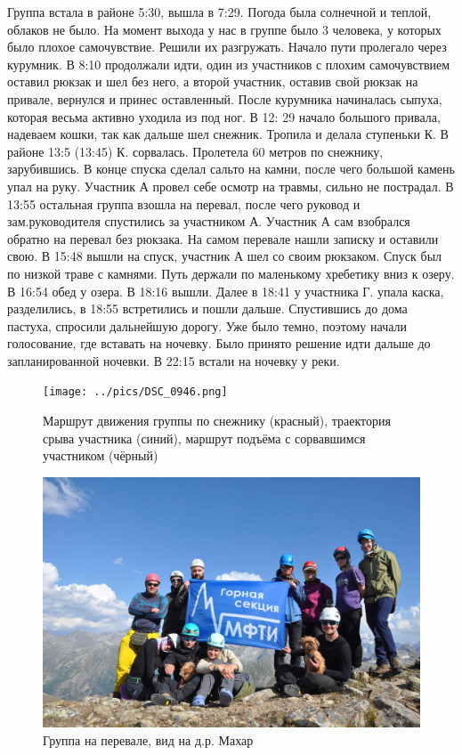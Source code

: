 Группа встала в районе 5:30, вышла в 7:29. Погода была солнечной и теплой, облаков не было. На момент выхода у нас в группе было 3 человека, у которых было плохое самочувствие. Решили их разгружать. Начало пути пролегало через курумник.  В 8:10 продолжали идти, один из участников с плохим самочувствием оставил рюкзак и шел без него, а второй участник, оставив свой рюкзак на привале, вернулся и принес оставленный.  После курумника начиналась сыпуха, которая весьма активно уходила из под ног. В 12: 29 начало большого привала, надеваем кошки, так как дальше шел снежник. Тропила и делала ступеньки К. В районе 13:5 (13:45) К. сорвалась. Пролетела 60 метров по снежнику, зарубившись. В конце спуска сделал сальто на камни, после чего большой камень упал на руку. Участник А провел себе осмотр на травмы, сильно не пострадал. В 13:55 остальная группа взошла на перевал, после чего руковод и зам.руководителя спустились за участником А. Участник А сам взобрался обратно на перевал без рюкзака. На самом перевале нашли записку и оставили свою.  В 15:48 вышли на спуск, участник А шел со своим рюкзаком. Спуск был по низкой траве с камнями. Путь держали по маленькому хребетику вниз к озеру.  В 16:54 обед у озера. В 18:16 вышли. Далее в 18:41 у участника Г. упала каска, разделились, в 18:55 встретились и пошли дальше. Спустившись до дома пастуха, спросили дальнейшую дорогу. Уже было темно, поэтому начали голосование, где вставать на ночевку. Было принято решение идти дальше до запланированной ночевки. 
В 22:15 встали на ночевку у реки.



\begin{figure}[h!]
	\centering
	\texttt{[image: ../pics/DSC\_0946.png]}
	\caption{Маршрут движения группы по снежнику (красный), траектория срыва участника (синий), маршрут подъёма с сорвавшимся участником (чёрный)}
	\label{fig:DSC_0946}
\end{figure}


\begin{figure}[h!]
	\centering
	\includegraphics[width=0.7\linewidth]{../pics/DSC_0982}
	\caption{Группа на перевале, вид на д.р. Махар}
	\label{fig:DSC_0982}
\end{figure}

